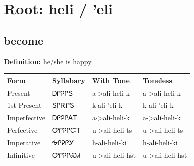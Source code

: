\documentclass{article}%
\begin{document}
%
\normalsize%
\section*{Root: heli / 'eli}%
\subsection*{become}%
\textbf{Definition: }%
he/she is happy%
\\[0.5em]%
\begin{tabular}{|l|l|l|l|}%
\hline%
\textbf{Form}&\textbf{Syllabary}&\textbf{With Tone}&\textbf{Toneless}\\%
\hline%
Present&ᎠᎵᎮᎵᎦ&a{-}>ali{-}heli{-}k&a{-}>ali{-}heli{-}k\\%
1st Present&ᎦᎵᎡᎵᎦ&k{-}ali{-}'eli{-}k&k{-}ali{-}'eli{-}k\\%
Imperfective&ᎠᎵᎮᎵᎪᎢ&a{-}>ali{-}heli{-}k&a{-}>ali{-}heli{-}k\\%
Perfective&ᎤᎵᎮᎵᏨᎢ&u{-}>ali{-}heli{-}ts&u{-}>ali{-}heli{-}ts\\%
Imperative&ᎭᎵᎮᎵᎩ&h{-}ali{-}heli{-}ki&h{-}ali{-}heli{-}ki\\%
Infinitive&ᎤᎵᎮᎵᏍᏗ&u{-}>ali{-}heli{-}hst&u{-}>ali{-}heli{-}hst\\%
\hline%
\end{tabular}%
\\[1em]%
\end{document}

